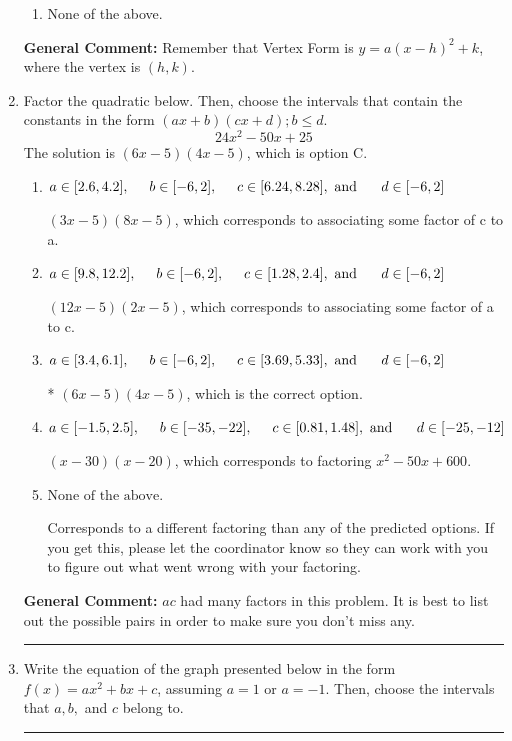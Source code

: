 \documentclass{extbook}[14pt]
\newcommand{\litem}[1]{\item #1

\rule{\textwidth}{0.4pt}}
\begin{document}
\begin{enumerate}
{\begin{enumerate}[label=\Alph*.]
\begin{multicols}{2}
\end{multicols}\item None of the above.\end{enumerate}
\textbf{General Comment:} Remember that Vertex Form is $y = a(x-h)^2+k$, where the vertex is $(h, k)$.
}
\litem{
Factor the quadratic below. Then, choose the intervals that contain the constants in the form $(ax+b)(cx+d); b \leq d.$
\[ 24x^{2} -50 x + 25 \]The solution is \( (6x -5)(4x -5) \), which is option C.\begin{enumerate}[label=\Alph*.]
\item \( a \in [2.6, 4.2], \hspace*{5mm} b \in [-6, 2], \hspace*{5mm} c \in [6.24, 8.28], \text{ and } \hspace*{5mm} d \in [-6, 2] \)

 $(3x -5)(8x -5)$, which corresponds to associating some factor of c to a.
\item \( a \in [9.8, 12.2], \hspace*{5mm} b \in [-6, 2], \hspace*{5mm} c \in [1.28, 2.4], \text{ and } \hspace*{5mm} d \in [-6, 2] \)

 $(12x -5)(2x -5)$, which corresponds to associating some factor of a to c.
\item \( a \in [3.4, 6.1], \hspace*{5mm} b \in [-6, 2], \hspace*{5mm} c \in [3.69, 5.33], \text{ and } \hspace*{5mm} d \in [-6, 2] \)

* $(6x -5)(4x -5)$, which is the correct option.
\item \( a \in [-1.5, 2.5], \hspace*{5mm} b \in [-35, -22], \hspace*{5mm} c \in [0.81, 1.48], \text{ and } \hspace*{5mm} d \in [-25, -12] \)

 $(x -30)(x -20)$, which corresponds to factoring $x^{2} -50 x + 600$.
\item \( \text{None of the above.} \)

 Corresponds to a different factoring than any of the predicted options. If you get this, please let the coordinator know so they can work with you to figure out what went wrong with your factoring.
\end{enumerate}

\textbf{General Comment:} $ac$ had many factors in this problem. It is best to list out the possible pairs in order to make sure you don't miss any.
}
\litem{
Write the equation of the graph presented below in the form $f(x)=ax^2+bx+c$, assuming  $a=1$ or $a=-1$. Then, choose the intervals that $a, b,$ and $c$ belong to.

}
\end{enumerate}
\end{document}
